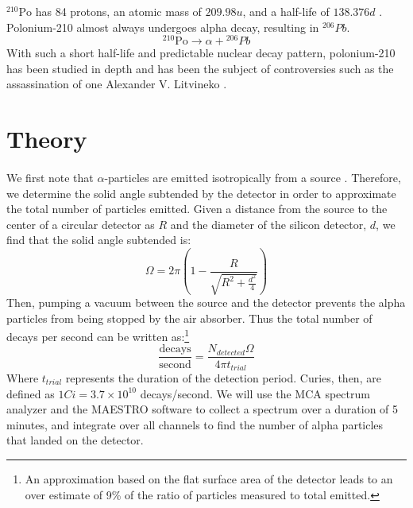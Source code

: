 \documentclass[12pt]{article}
\newcommand{\po}{{}^{210}\text{Po}}
\begin{document}
\begin{multicols}{2}
    $\po$ has 84 protons, an atomic mass of $209.98 u$, and a half-life of $138.376 d$ \cite{table}. Polonium-210 almost always undergoes alpha decay, resulting in ${}^{206}Pb$.
    \begin{equation}
        \po \rightarrow \alpha + {}^{206}Pb
    \end{equation}
    With such a short half-life and predictable nuclear decay pattern, polonium-210 has been studied in depth and has been the subject of controversies such as the assassination of one Alexander V. Litvineko \cite{roessler}.


    \section{Theory}
    
    \paragraph{} We first note that $\alpha$-particles are emitted isotropically from a source \cite{kovash}. Therefore, we determine the solid angle subtended by the detector in order to approximate the total number of particles emitted. Given a distance from the source to the center of a circular detector as $R$ and the diameter of the silicon detector, $d$, we find that the solid angle subtended is:
    \begin{equation}
        \Omega = 2\pi\left(1-\frac{R}{\sqrt{R^2 + \frac{d^2}{4}}}\right)
        \label{solidAngle}
    \end{equation}
    Then, pumping a vacuum between the source and the detector prevents the alpha particles from being stopped by the air absorber. Thus the total number of decays per second can be written as:\footnote{An approximation based on the flat surface area of the detector leads to an over estimate of 9\% of the ratio of particles measured to total emitted.}
    \begin{equation}
        \frac{\text{decays}}{\text{second}} = \frac{N_{detected}\Omega}{4\pi t_{trial}}
    \end{equation}
    Where $t_{trial}$ represents the duration of the detection period. Curies, then, are defined as $1 Ci = 3.7 \times 10^{10}$ decays/second. We will use the MCA spectrum analyzer and the MAESTRO software to collect a spectrum over a duration of 5 minutes, and integrate over all channels to find the number of alpha particles that landed on the detector. \cite{kovash}


\end{multicols}
\end{document}
